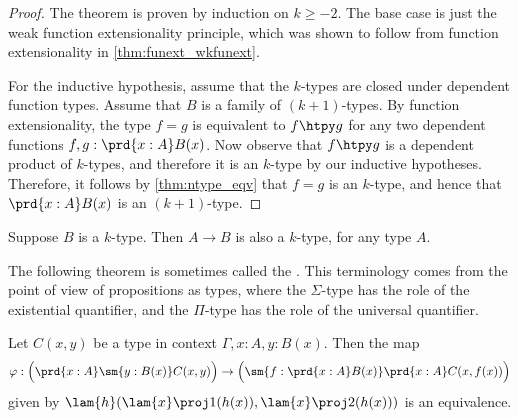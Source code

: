 \begin{proof}
The theorem is proven by induction on $k\geq -2$. The base case is just the weak function extensionality principle, which was shown to follow from function extensionality in \autoref{thm:funext_wkfunext}.

For the inductive hypothesis, assume that the $k$-types are closed under dependent function types. Assume that $B$ is a family of $(k+1)$-types. By function extensionality, the type $f=g$ is equivalent to $f\htpy g$ for any two dependent functions $f,g:\prd{x:A}B(x)$. Now observe that $f\htpy g$ is a dependent product of $k$-types, and therefore it is an $k$-type by our inductive hypotheses. Therefore, it follows by \autoref{thm:ntype_eqv} that $f=g$ is an $k$-type, and hence that $\prd{x:A}B(x)$ is an $(k+1)$-type.
\end{proof}

\begin{cor}
Suppose $B$ is a $k$-type. Then $A\to B$ is also a $k$-type, for any type $A$.
\end{cor}

The following theorem is sometimes called the . This terminology comes from the point of view of propositions as types, where the $\Sigma$-type has the role of the existential quantifier, and the $\Pi$-type has the role of the universal quantifier.

\begin{thm}
Let $C(x,y)$ be a type in context $\Gamma,x:A,y:B(x)$. Then the map
\begin{equation*}
\varphi:\Big(\prd{x:A}\sm{y:B(x)}C(x,y)\Big)\to \Big(\sm{f:\prd{x:A}B(x)}\prd{x:A}C(x,f(x))\Big)
\end{equation*}
given by $\lam{h}(\lam{x}\proj 1(h(x)),\lam{x}\proj 2(h(x)))$ is an equivalence.
\end{thm}


